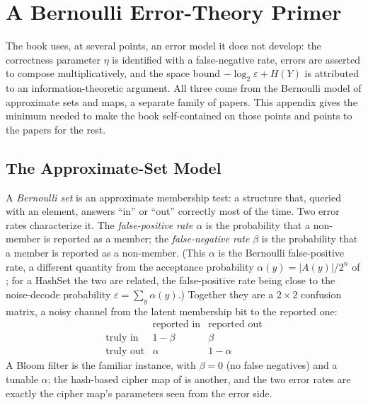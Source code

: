 
\chapter{A Bernoulli Error-Theory Primer}
\label{app:bernoulli}

The book uses, at several points, an error model it does not develop: the
correctness parameter $\eta$ is identified with a false-negative rate, errors
are asserted to compose multiplicatively, and the space bound
$-\log_2\varepsilon + H(Y)$ is attributed to an information-theoretic
argument. All three come from the Bernoulli model of approximate sets and
maps, a separate family of papers. This appendix gives the minimum needed to
make the book self-contained on those points and points to the papers for
the rest.

\section{The Approximate-Set Model}
\label{sec:bernoulli-model}

A \emph{Bernoulli set} is an approximate membership test: a structure that,
queried with an element, answers ``in'' or ``out'' correctly most of the
time. Two error rates characterize it. The \emph{false-positive rate}
$\alpha$ is the probability that a non-member is reported as a member; the
\emph{false-negative rate} $\beta$ is the probability that a member is
reported as a non-member. (This $\alpha$ is the Bernoulli false-positive
rate, a different quantity from the acceptance probability $\alpha(y) =
\lvert A(y)\rvert/2^n$ of ; for a HashSet the two are
related, the false-positive rate being close to the noise-decode probability
$\varepsilon = \sum_y \alpha(y)$.) Together they are a $2 \times 2$ confusion
matrix,
a noisy channel from the latent membership bit to the reported one:
\[
  \begin{array}{c|cc}
     & \text{reported in} & \text{reported out} \\\hline
    \text{truly in}  & 1 - \beta & \beta \\
    \text{truly out} & \alpha    & 1 - \alpha
  \end{array}
\]
A Bloom filter is the familiar instance, with $\beta = 0$ (no false
negatives) and a tunable $\alpha$; the hash-based cipher map of
 is another, and the two error rates are exactly
the cipher map's parameters seen from the error side.


